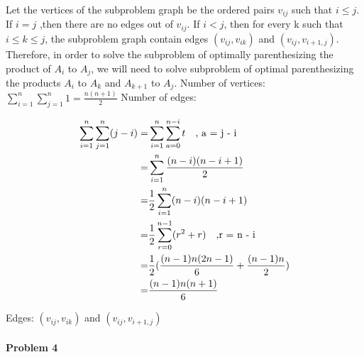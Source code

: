 \documentclass[11pt]{article}
\begin{document}
\begin{flushleft}
    Let the vertices of the subproblem graph be the ordered pairs $v_{ij}$ such that $i \leq j$.
    If $i = j$ ,then there are no edges out of $v_{ij}$. If $i < j$, then for every k such that $i \leq k \leq j$,
    the subproblem graph contain edges $(v_{ij}, v_{ik})$ and $(v_{ij}, v_{i+1,j})$.
    \newline
    \newline
    Therefore, in order to solve the subproblem of optimally parenthesizing the product of $A_i$ to $A_j$, we will need to solve
    subproblem of optimal parenthesizing the products $A_i$ to $A_k$ and $A_{k+1}$ to $A_j$.
    \newline
    \newline
    Number of vertices: $\sum_{i=1}^n \sum_{j=1}^n 1= \frac{n(n+1)}{2}$
    \newpage
    Number of edges: 
\end{flushleft}
\begin{equation*}
\begin {split}
    \sum_{i=1}^n \sum_{j=1}^n (j - i) =& \sum_{i = 1}^n \sum_{a = 0}^{n-i}t \text{\quad , a = j - i}\\
    =& \sum_{i = 1}^n \frac{(n-i)(n-i+1)}{2}\\
    =& \frac{1}{2}\sum_{i = 1}^n (n-i)(n-i+1)\\
    =& \frac{1}{2}\sum_{r = 0}^{n-1} (r^2 + r) \text{\quad ,r = n - i}\\
    =& \frac{1}{2}(\frac{(n-1)n(2n-1)}{6} + \frac{(n-1)n}{2}) \\
    =& \frac{(n-1)n(n+1)}{6}
\end {split}
\end{equation*}
\begin{flushleft}
    Edges: $(v_{ij}, v_{ik})$ and $(v_{ij}, v_{i+1,j})$
\end{flushleft}

\paragraph{\noindent\textbf{\LARGE{Problem 4}}}
\end{document}
